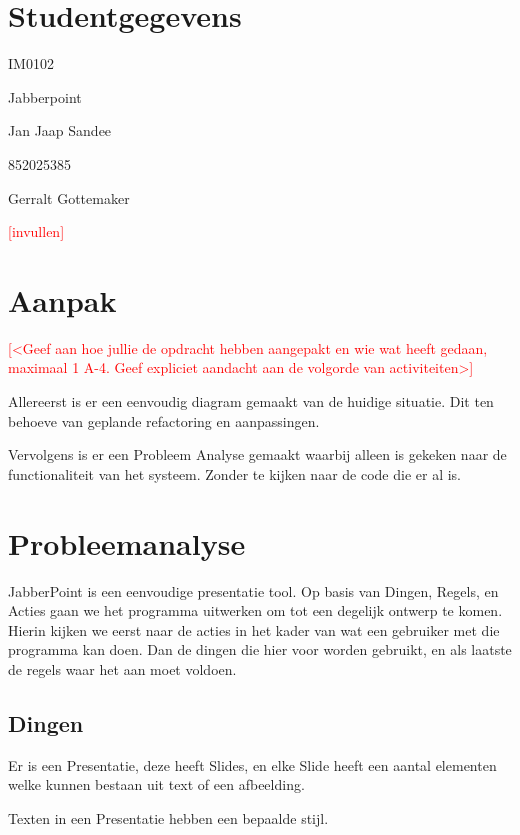 \documentclass[a4paper]{article}
\newcommand{\todo}[1]{\textcolor{red}{[#1]}}
\begin{document}
\pagestyle{fancy}

\section*{Studentgegevens}
\begin{description}
	\item [Cursuscode] IM0102
	\item Jabberpoint
    \item Jan Jaap Sandee
	\item 852025385
	\item Gerralt Gottemaker
	\item [Studentnummer] \todo{invullen}
\end{description}

\section*{Aanpak}
\todo{<Geef aan hoe jullie de opdracht hebben aangepakt en wie wat heeft gedaan,
maximaal 1 A-4. Geef expliciet aandacht aan de volgorde van activiteiten>}

Allereerst is er een eenvoudig diagram gemaakt van de huidige situatie. Dit ten
behoeve van geplande refactoring en aanpassingen.

Vervolgens is er een Probleem Analyse gemaakt waarbij alleen is gekeken naar de
functionaliteit van het systeem. Zonder te kijken naar de code die er al is.


\section{Probleemanalyse}
JabberPoint is een eenvoudige presentatie tool. Op basis van Dingen, Regels, en
Acties gaan we het programma uitwerken om tot een degelijk ontwerp te komen.
Hierin kijken we eerst naar de acties in het kader van wat een gebruiker met die
programma kan doen. Dan de dingen die hier voor worden gebruikt, en als laatste
de regels waar het aan moet voldoen.

\subsection{Dingen}

Er is een Presentatie, deze heeft Slides, en elke Slide heeft een aantal
elementen welke kunnen bestaan uit text of een afbeelding.

Texten in een Presentatie hebben een bepaalde stijl.
\end{document}
